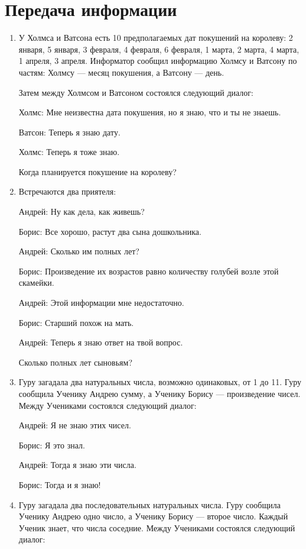 \documentclass[12pt]{article}
\theoremstyle{definition}
\begin{document}
\newpage
\setcounter{section}{3}
\section{Передача информации}

\begin{enumerate}
\item У Холмса и Ватсона есть 10 предполагаемых дат покушений на королеву: 2 января, 5 января, 
3 февраля, 4 февраля, 6 февраля, 1 марта, 2 марта, 4 марта, 1 апреля, 3 апреля.
Информатор сообщил информацию Холмсу и Ватсону по частям: Холмсу — месяц покушения, а Ватсону — день.

Затем между Холмсом и Ватсоном состоялся следующий диалог:

Холмс: Мне неизвестна дата покушения, но я знаю, что и ты не знаешь.

Ватсон: Теперь я знаю дату.

Холмс: Теперь я тоже знаю.

Когда планируется покушение на королеву?


\item Встречаются два приятеля:

Андрей: Ну как дела, как живешь?

Борис: Все хорошо, растут два сына дошкольника.

Андрей: Сколько им полных лет?

Борис: Произведение их возрастов равно количеству голубей возле этой скамейки.

Андрей: Этой информации мне недостаточно.

Борис: Старший похож на мать.

Андрей: Теперь я знаю ответ на твой вопрос. 

Сколько полных лет сыновьям?


\item Гуру загадала два натуральных числа, возможно одинаковых, от 1 до 11. 
Гуру сообщила Ученику Андрею сумму, а Ученику Борису — произведение чисел. 
Между Учениками состоялся следующий диалог:

Андрей: Я не знаю этих чисел.

Борис: Я это знал.

Андрей: Тогда я знаю эти числа.

Борис: Тогда и я знаю! 


\item Гуру загадала два последовательных натуральных числа. 
Гуру сообщила Ученику Андрею одно число, а Ученику Борису — второе число. 
Каждый Ученик знает, что числа соседние. Между Учениками состоялся следующий диалог:


\end{enumerate}
\end{document}

